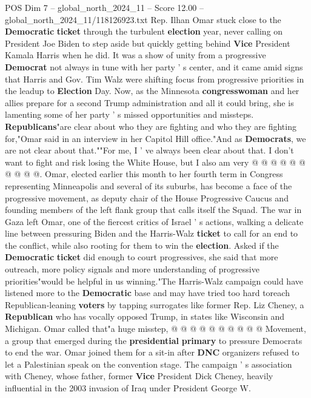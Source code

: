 \begin{textsample}{POS Dim 7 – global\_north\_2024\_11 – Score 12.00 – global\_north\_2024\_11/118126923.txt}  \label{ex:f7_pos_112}
Rep.
Ilhan Omar stuck close to the \textbf{Democratic} \textbf{ticket} through the turbulent \textbf{election} year, never calling on President Joe Biden to step aside but quickly getting behind \textbf{Vice} President Kamala Harris when he did.
It was a show of unity from a progressive \textbf{Democrat} not always in tune with her party ' s center, and it came amid signs that Harris and Gov.
Tim Walz were shifting focus from progressive priorities in the leadup to \textbf{Election} Day.
Now, as the Minnesota \textbf{congresswoman} and her allies prepare for a second Trump administration and all it could bring, she is lamenting some of her party ' s missed opportunities and missteps. \textbf{Republicans}"are clear about who they are fighting and who they are fighting for,"Omar said in an interview in her Capitol Hill office."And as \textbf{Democrats}, we are not clear about that.""For me, I ' ve always been clear about that.
I don't want to fight and risk losing the White House, but I also am very @ @ @ @ @ @ @ @ @ @.
Omar, elected earlier this month to her fourth term in Congress representing Minneapolis and several of its suburbs, has become a face of the progressive movement, as deputy chair of the House Progressive Caucus and founding members of the left flank group that calls itself the Squad.
The war in Gaza left Omar, one of the fiercest critics of Israel ' s actions, walking a delicate line between pressuring Biden and the Harris-Walz \textbf{ticket} to call for an end to the conflict, while also rooting for them to win the \textbf{election}.
Asked if the \textbf{Democratic} \textbf{ticket} did enough to court progressives, she said that more outreach, more policy signals and more understanding of progressive priorities"would be helpful in us winning."The Harris-Walz campaign could have listened more to the \textbf{Democratic} base and may have tried too hard toreach Republican-leaning \textbf{voters} by tapping surrogates like former Rep.
Liz Cheney, a \textbf{Republican} who has vocally opposed Trump, in states like Wisconsin and Michigan.
Omar called that"a huge misstep, @ @ @ @ @ @ @ @ @ @ Movement, a group that emerged during the \textbf{presidential} \textbf{primary} to pressure Democrats to end the war.
Omar joined them for a sit-in after \textbf{DNC} organizers refused to let a Palestinian speak on the convention stage.
The campaign ' s association with Cheney, whose father, former \textbf{Vice} President Dick Cheney, heavily influential in the 2003 invasion of Iraq under President George W.

\end{textsample}
